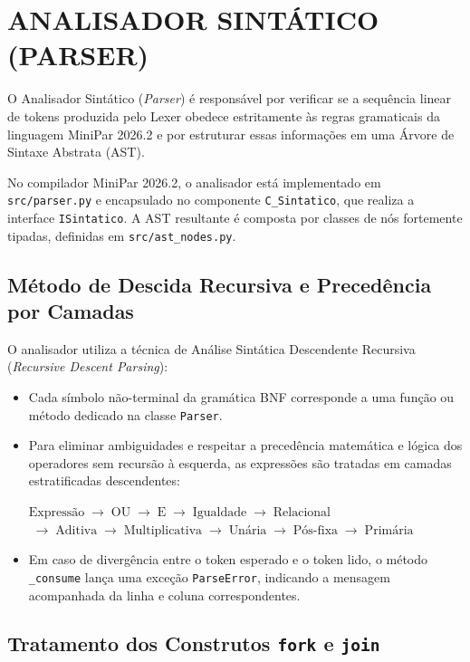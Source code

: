 \chapter{ANALISADOR SINTÁTICO (PARSER)}

O Analisador Sintático (\textit{Parser}) é responsável por verificar se a sequência linear de tokens produzida pelo Lexer obedece estritamente às regras gramaticais da linguagem MiniPar 2026.2 e por estruturar essas informações em uma Árvore de Sintaxe Abstrata (AST).

No compilador MiniPar 2026.2, o analisador está implementado em \texttt{src/parser.py} e encapsulado no componente \texttt{C\_Sintatico}, que realiza a interface \texttt{ISintatico}. A AST resultante é composta por classes de nós fortemente tipadas, definidas em \texttt{src/ast\_nodes.py}.

\section{Método de Descida Recursiva e Precedência por Camadas}

O analisador utiliza a técnica de Análise Sintática Descendente Recursiva (\textit{Recursive Descent Parsing}):
\begin{itemize}
    \item Cada símbolo não-terminal da gramática BNF corresponde a uma função ou método dedicado na classe \texttt{Parser}.
    \item Para eliminar ambiguidades e respeitar a precedência matemática e lógica dos operadores sem recursão à esquerda, as expressões são tratadas em camadas estratificadas descendentes:
    \begin{center}
    \small
    $\text{Expressão} \;\longrightarrow\; \text{OU} \;\longrightarrow\; \text{E} \;\longrightarrow\; \text{Igualdade} \;\longrightarrow\; \text{Relacional}$ \\
    $\;\longrightarrow\; \text{Aditiva} \;\longrightarrow\; \text{Multiplicativa} \;\longrightarrow\; \text{Unária} \;\longrightarrow\; \text{Pós-fixa} \;\longrightarrow\; \text{Primária}$
    \end{center}
    \item Em caso de divergência entre o token esperado e o token lido, o método \texttt{\_consume} lança uma exceção \texttt{ParseError}, indicando a mensagem acompanhada da linha e coluna correspondentes.
\end{itemize}

\section{Tratamento dos Construtos \texttt{fork} e \texttt{join}}

